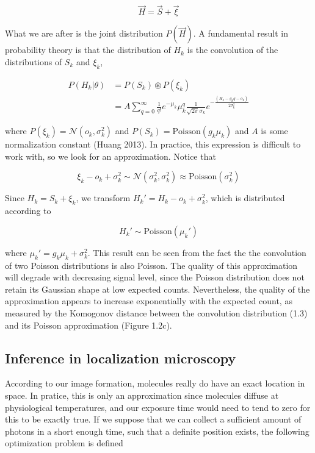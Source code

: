\documentclass{ucetd}
\begin{document}
\begin{equation}
\vec{H} = \vec{S} + \vec{\xi}
\end{equation}

What we are after is the joint distribution $P(\vec{H})$. A fundamental result in probability theory is that the distribution of $H_{k}$ is the convolution of the distributions of $S_{k}$ and $\xi_{k}$,

\begin{align}
P(H_{k}|\theta) &= P(S_{k})\circledast P(\xi_{k})\\
&= A\sum_{q=0}^{\infty} \frac{1}{q!}e^{-\mu_{k}}\mu_{k}^{q}\frac{1}{\sqrt{2\pi}\sigma_{k}}e^{-\frac{(H_{k}-g_{k}q-o_{k})}{2\sigma_{k}^{2}}}
\end{align}

where $P(\xi_{k}) = \mathcal{N}(o_{k},\sigma_{k}^{2})$ and $P(S_{k}) = \mathrm{Poisson}(g_{k}\mu_{k})$ and $A$ is some normalization constant (Huang 2013). In practice, this expression is difficult to work with, so we look for an approximation. Notice that 

\begin{equation*}
\xi_{k} - o_{k} + \sigma_{k}^{2} \sim \mathcal{N}(\sigma_{k}^{2},\sigma_{k}^{2}) \approx \mathrm{Poisson}(\sigma_{k}^{2})
\end{equation*}

Since $H_{k} = S_{k} + \xi_{k}$, we transform $H_{k}' = H_{k} - o_{k} + \sigma_{k}^{2}$, which is distributed according to 

\begin{equation*}
H_{k}' \sim \mathrm{Poisson}(\mu_{k}')
\end{equation*}

where $\mu_{k}' = g_{k}\mu_{k} + \sigma_{k}^{2}$. This result can be seen from the fact the the convolution of two Poisson distributions is also Poisson. The quality of this approximation will degrade with decreasing signal level, since the Poisson distribution does not retain its Gaussian shape at low expected counts. Nevertheless, the quality of the approximation appears to increase exponentially with the expected count, as measured by the Komogonov distance between the convolution distribution (1.3) and its Poisson approximation (Figure 1.2c).


\subsection{Inference in localization microscopy}

According to our image formation, molecules really do have an exact location in space. In pratice, this is only an approximation since molecules diffuse at physiological temperatures, and our exposure time would need to tend to zero for this to be exactly true. If we suppose that we can collect a sufficient amount of photons in a short enough time, such that a definite position exists, the following optimization problem is defined
\end{document}
